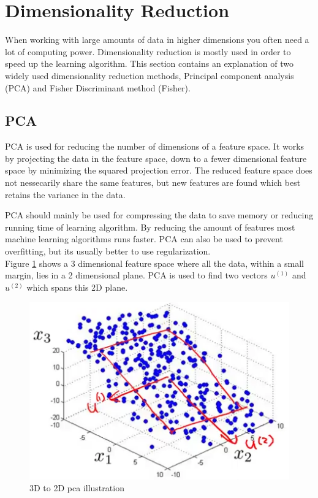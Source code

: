 
\section{Dimensionality Reduction}
When working with large amounts of data in higher dimensions you often need a lot of computing power. Dimensionality reduction is mostly used in order to speed up the learning algorithm. This section contains an explanation of two widely used dimensionality reduction methods, Principal component analysis (PCA) and Fisher Discriminant method (Fisher).


\subsection{PCA}

PCA is used for reducing the number of dimensions of a feature space.
It works by projecting the data in the feature space, down to a fewer dimensional feature space by minimizing the squared projection error.
The reduced feature space does not nessecarily share the same features, but new features are found which best retains the variance in the data.

PCA should mainly be used for compressing the data to save memory or reducing running time of learning algorithm.
By reducing the amount of features most machine learning algorithms runs faster.
PCA can also be used to prevent overfitting, but its usually better to use regularization. \\

Figure \ref{fig:pca} shows a 3 dimensional feature space where all the data, within a small margin, lies in a 2 dimensional plane.
PCA is used to find two vectors $u^{(1)}$ and $u^{(2)}$ which spans this 2D plane.

\begin{figure}[H]
\centering
\includegraphics{billeder/pca}
\caption{3D to 2D pca illustration}
\label{fig:pca}
\end{figure}


